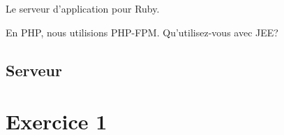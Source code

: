 Le serveur d'application pour Ruby.

\begin{otherlanguage}{english}

\begin{Shaded}
\begin{Highlighting}[]



\end{Highlighting}
\end{Shaded}

\end{otherlanguage}

En PHP, nous utilisions PHP-FPM. Qu'utilisez-vous avec JEE?

\hypertarget{serveur}{%
\subsection{Serveur}\label{serveur}}

\begin{otherlanguage}{english}

\begin{Shaded}
\begin{Highlighting}[]
\NormalTok{$ }

\NormalTok{$ }
\NormalTok{[}\NormalTok{]}
\end{Highlighting}
\end{Shaded}

\end{otherlanguage}

\hypertarget{exercice-1}{%
\section{Exercice 1}\label{exercice-1}}

